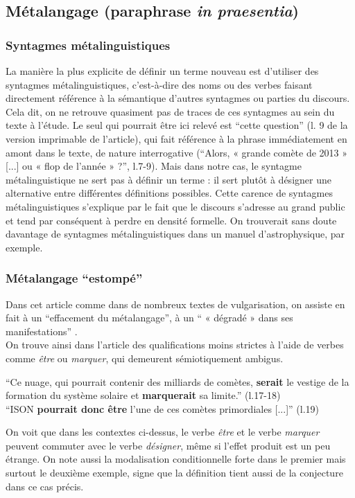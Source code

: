\documentclass[a4paper,10pt]{article}
\begin{document}
	\subsection{Métalangage (paraphrase \textit{in praesentia})} \label{inpraesentia}
		\subsubsection{Syntagmes métalinguistiques}
			La manière la plus explicite de définir un terme nouveau est d'utiliser des syntagmes métalinguistiques, c'est-à-dire des noms ou des verbes faisant directement référence à la sémantique d'autres syntagmes ou parties du discours. Cela dit, on ne retrouve quasiment pas de traces de ces syntagmes au sein du texte à l'étude. Le seul qui pourrait être ici relevé est ``cette question'' (l. 9 de la version imprimable de l'article), qui fait référence à la phrase immédiatement en amont dans le texte, de nature interrogative (``Alors, « grande comète de 2013 » [...] ou « flop de l'année » ?'', l.7-9). Mais dans notre cas, le syntagme métalinguistique ne sert pas à définir un terme : il sert plutôt à désigner une alternative entre différentes définitions possibles.
			Cette carence de syntagmes métalinguistiques s'explique par le fait que le discours s'adresse au grand public et tend par conséquent à perdre en densité formelle. On trouverait sans doute davantage de syntagmes métalinguistiques dans un manuel d'astrophysique, par exemple.
		\subsubsection{Métalangage ``estompé''} \label{estompe}
			Dans cet article comme dans de nombreux textes de vulgarisation, on assiste en fait à un ``effacement du métalangage'', à un `` « dégradé » dans ses manifestations'' \cite{Mortureux1982}.\\
			On trouve ainsi dans l'article des qualifications moins strictes à l'aide de verbes comme \textit{être} ou \textit{marquer}, qui demeurent sémiotiquement ambigus.
			\begin{center}
				\footnotesize
				\begin{minipage}{0.7\textwidth}
					``Ce nuage, qui pourrait contenir des milliards de comètes, \textbf{serait} le vestige de la formation du système solaire et \textbf{marquerait} sa limite.'' (l.17-18)\\
					``ISON \textbf{pourrait donc être} l'une de ces comètes primordiales [...]'' (l.19)
				\end{minipage}
			\end{center}
			On voit que dans les contextes ci-dessus, le verbe \textit{être} et le verbe \textit{marquer} peuvent commuter avec le verbe \textit{désigner}, même si l'effet produit est un peu étrange. On note aussi la modalisation conditionnelle forte dans le premier mais surtout le deuxième exemple, signe que la définition tient aussi de la conjecture dans ce cas précis.\\
			
\end{document}
